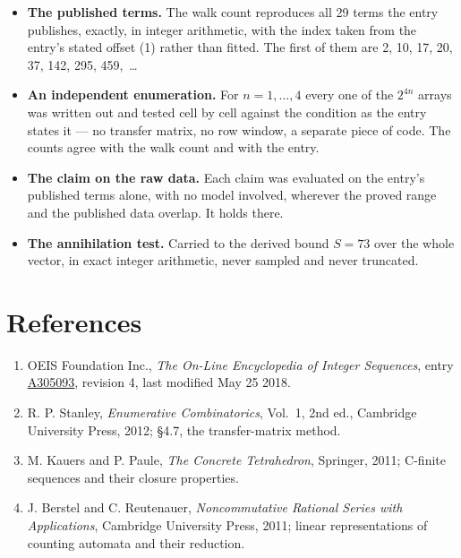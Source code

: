 \documentclass[11pt]{article}
\theoremstyle{definition}
\begin{document}
\begin{itemize}

\item {\bfseries The published terms.} The walk count reproduces all 29 terms the entry publishes, exactly, in integer arithmetic, with the index taken from the entry's stated offset (1) rather than fitted. The first of them are 2, 10, 17, 20, 37, 142, 295, 459,~\dots

\item {\bfseries An independent enumeration.} For $n = 1,\dots,4$ every one of the $2^{4n}$ arrays was written out and tested cell by cell against the condition as the entry states it --- no transfer matrix, no row window, a separate piece of code. The counts agree with the walk count and with the entry.

\item {\bfseries The claim on the raw data.} Each claim was evaluated on the entry's published terms alone, with no model involved, wherever the proved range and the published data overlap. It holds there.

\item {\bfseries The annihilation test.} Carried to the derived bound $S = 73$ over the whole vector, in exact integer arithmetic, never sampled and never truncated.

\end{itemize}

\section{References}

\begin{enumerate}

\item OEIS Foundation Inc., \emph{The On-Line Encyclopedia of Integer Sequences}, entry \href{https://oeis.org/A305093}{A305093}, revision 4, last modified May 25 2018.

\item R. P. Stanley, \emph{Enumerative Combinatorics}, Vol.~1, 2nd ed., Cambridge University Press, 2012; \S4.7, the transfer-matrix method.

\item M. Kauers and P. Paule, \emph{The Concrete Tetrahedron}, Springer, 2011; C-finite sequences and their closure properties.

\item J. Berstel and C. Reutenauer, \emph{Noncommutative Rational Series with Applications}, Cambridge University Press, 2011; linear representations of counting automata and their reduction.

\end{enumerate}
\end{document}
